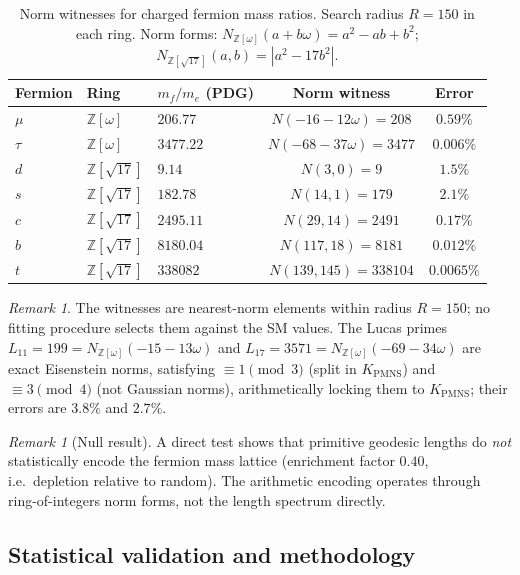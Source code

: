 \documentclass[11pt,a4paper]{article}
\theoremstyle{definition}
\theoremstyle{remark}
\newtheorem{remark}[theorem]{Remark}
\newcommand{\KPMNS}{K_{\mathrm{PMNS}}}
\newcommand{\Zom}{\mathbb{Z}[\omega]}
\newcommand{\Zsev}{\mathbb{Z}[\sqrt{17}]}
\begin{document}
\begin{table}[htbp]
\centering
\caption{Norm witnesses for charged fermion mass ratios.
Search radius $R=150$ in each ring.
Norm forms: $N_{\Zom}(a+b\omega)=a^2-ab+b^2$;
$N_{\Zsev}(a,b)=|a^2-17b^2|$.}
\label{tab:witnesses}
\begin{tabular}{lllcc}
\toprule
Fermion & Ring & $m_f/m_e$ (PDG) & Norm witness & Error \\
\midrule
$\mu$  & $\Zom$ & $206.77$
  & $N(-16-12\omega)=208$      & $0.59\%$ \\
$\tau$ & $\Zom$ & $3477.22$
  & $N(-68-37\omega)=3477$     & $0.006\%$ \\
\midrule
$d$ & $\Zsev$ & $9.14$
  & $N(3,0)=9$                  & $1.5\%$ \\
$s$ & $\Zsev$ & $182.78$
  & $N(14,1)=179$               & $2.1\%$ \\
$c$ & $\Zsev$ & $2495.11$
  & $N(29,14)=2491$             & $0.17\%$ \\
$b$ & $\Zsev$ & $8180.04$
  & $N(117,18)=8181$              & $0.012\%$ \\
$t$ & $\Zsev$ & $338082$
  & $N(139,145)=338104$         & $0.0065\%$ \\
\bottomrule
\end{tabular}
\end{table}

\begin{remark}
The witnesses are nearest-norm elements within radius $R=150$;
no fitting procedure selects them against the SM values.
The Lucas primes $L_{11}=199=N_{\Zom}(-15-13\omega)$ and
$L_{17}=3571=N_{\Zom}(-69-34\omega)$ are exact Eisenstein norms,
satisfying $\equiv1\pmod3$ (split in $\KPMNS$) and
$\equiv3\pmod4$ (not Gaussian norms), arithmetically locking
them to $\KPMNS$; their errors are $3.8\%$ and $2.7\%$.
\end{remark}

\begin{remark}[Null result]
A direct test shows that primitive geodesic lengths do
\emph{not} statistically encode the fermion mass lattice
(enrichment factor $0.40$, i.e.\ depletion relative to random).
The arithmetic encoding operates through ring-of-integers
norm forms, not the length spectrum directly.
\end{remark}

\subsection{Statistical validation and methodology}
\end{document}
